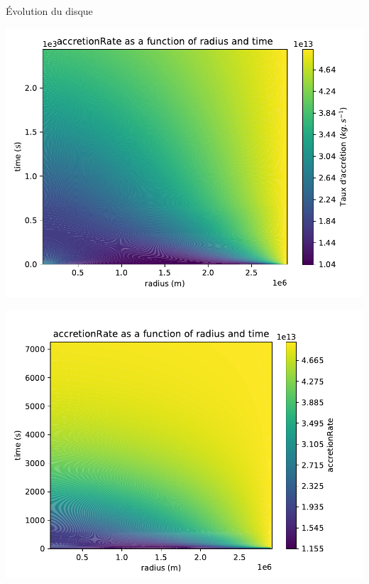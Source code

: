\documentclass{beamer}
\begin{document}
\begin{frame}{Évolution du disque}
	\centering
   \begin{minipage}[c]{.49\linewidth}
      \includegraphics[width = 0.98\linewidth]{accretionRate10M}
   \end{minipage} \hfill
   \begin{minipage}[c]{.49\linewidth}
      \includegraphics[width = 0.98\linewidth]{accretionRate-stable}
   \end{minipage}
\end{frame}
\end{document}
